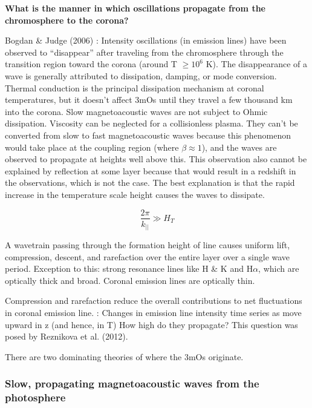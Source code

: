 
\textbf{What is the manner in which oscillations propagate from the chromosphere
to the corona?}

Bogdan \& Judge (2006)
: Intensity
oscillations (in emission lines) have been observed to ``disappear'' after
traveling from the chromosphere through the transition region toward the corona
(around T $\ge 10^{6}$ K).
The disappearance of a wave is generally attributed to
dissipation, damping, or mode conversion.
Thermal conduction is the principal
dissipation mechanism at coronal temperatures, but it doesn't affect 3mOs
until they travel a few thousand km into the corona.
Slow magnetoacoustic waves are not subject to Ohmic dissipation.
Viscosity can be neglected for a
collisionless plasma. They can’t be converted from slow to fast magnetoacoustic
waves because this phenomenon would take place at the coupling region
(where $\beta \approx 1$),
and the waves are observed to propagate at heights well above this.
This
observation also cannot be explained by reflection at some layer because that
would result in a redshift in the observations, which is not the case.
The best explanation is that the rapid increase in the temperature scale height
causes the waves to dissipate.

    \begin{equation}
        \frac{2\pi}{k_{||}} \gg H_{T}
    \end{equation}

A wavetrain passing through the formation height of line causes uniform lift,
compression, descent, and rarefaction over the entire layer over a single wave
period. Exception to this: strong resonance lines like
 H \& K and H$\alpha$, which
are optically thick and broad.
Coronal emission lines are optically thin.

Compression and rarefaction reduce the overall contributions to net
fluctuations in coronal emission line.
:
Changes in emission line intensity time series as move upward in z
(and hence, in T)
How high do they propagate? This question was posed by Reznikova et al. (2012).





There are two dominating theories of where the 3mOs originate.


\subsubsection{Slow, propagating magnetoacoustic waves from the photosphere}

